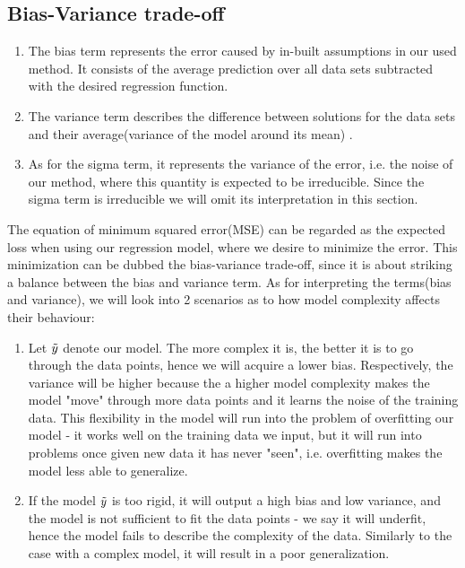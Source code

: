 \documentclass[aps,rmp,reprint,amsmath,amssymb,graphicx,longbibliography]{revtex4-1}
\begin{document}
\subsection{Bias-Variance trade-off\label{BV:BV}}

\begin{enumerate}
    \item The bias term represents the error caused by in-built assumptions in our used method. It consists of the average prediction over all data sets subtracted with the desired regression function.

    \item The variance term describes the difference between solutions for the data sets and their average(variance of the model around its mean) \cite{bishop_2006_pattern}.

    \item As for the sigma term, it represents the variance of the error, i.e. the noise of our method, where this quantity is expected to be irreducible. Since the sigma term is irreducible we will omit its interpretation in this section. 
\end{enumerate}

The equation of minimum squared error(MSE) can be regarded as the expected loss when using our regression model, where we desire to minimize the error. This minimization can be dubbed the bias-variance trade-off, since it is about striking a balance between the bias and variance term. As for interpreting the terms(bias and variance), we will look into 2 scenarios as to how model complexity affects their behaviour:

\begin{enumerate}
    \item Let $\Tilde{y}$ denote our model. The more complex it is, the better it is to go through the data points, hence we will acquire a lower bias. Respectively, the variance will be higher because the a higher model complexity makes the model "move" through more data points and it learns the noise of the training data. This flexibility in the model will run into the problem of overfitting our model - it works well on the training data we input, but it will run into problems once given new data it has never "seen", i.e. overfitting makes the model less able to generalize.

    \item If the model $\Tilde{y}$ is too rigid, it will output a high bias and low variance, and the model is not sufficient to fit the data points - we say it will underfit, hence the model fails to describe the complexity of the data. Similarly to the case with a complex model, it will result in a poor generalization.
\end{enumerate}
\end{document}
